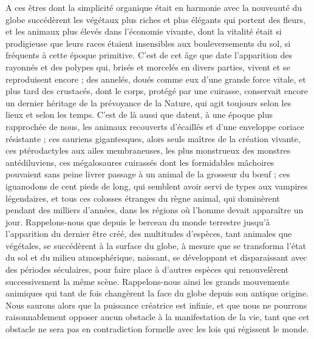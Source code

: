 \documentclass[a4paper, 11pt, oneside]{article}
\begin{document}
A ces êtres dont la simplicité organique était en harmonie avec la nouveauté du globe succédèrent les végétaux plus riches et plus élégants qui portent des fleurs, et les animaux plus élevés dans l'économie vivante, dont la vitalité était si prodigieuse que leurs races étaient insensibles aux bouleversements du sol, si fréquents à cette époque primitive. C'est de cet âge que date l'apparition des rayonnés et des polypes qui, brisés et morcelés en divers parties, vivent et se reproduisent encore ; des annelés, doués comme eux d'une grande force vitale, et plus tard des crustacés, dont le corps, protégé par une cuirasse, conservait encore un dernier héritage de la prévoyance de la Nature, qui agit toujours selon les lieux et selon les temps. C'est de là aussi que datent, à une époque plus rapprochée de nous, les animaux recouverts d'écaillés et d'une enveloppe coriace résistante ; ces sauriens gigantesques, alors seuls maîtres de la création vivante, ces ptérodactyles aux ailes membraneuses, les plus monstrueux des monstres antédiluviens, ces mégalosaures cuirassés dont les formidables mâchoires pouvaient sans peine livrer passage à un animal de la grosseur du bœuf ; ces iguanodons de cent pieds de long, qui semblent avoir servi de types aux vampires légendaires, et tous ces colosses étranges du règne animal, qui dominèrent pendant des milliers d'années, dans les régions où l'homme devait apparaître un jour. Rappelons-nous que depuis le berceau du monde terrestre jusqu'à l'apparition du dernier être créé, des multitudes d'espèces, tant animales que végétales, se succédèrent à la surface du globe, à mesure que se transforma l'état du sol et du milieu atmosphérique, naissant, se développant et disparaissant avec des périodes séculaires, pour faire place à d'autres espèces qui renouvelèrent successivement la même scène. Rappelons-nous ainsi les grands mouvements animiques qui tant de fois changèrent la face du globe depuis son antique origine. Nous saurons alors que la puissance créatrice est infinie, et que nous ne pourrons raisonnablement opposer aucun obstacle à la manifestation de la vie, tant que cet obstacle ne sera pas en contradiction formelle avec les lois qui régissent le monde.
\end{document}
